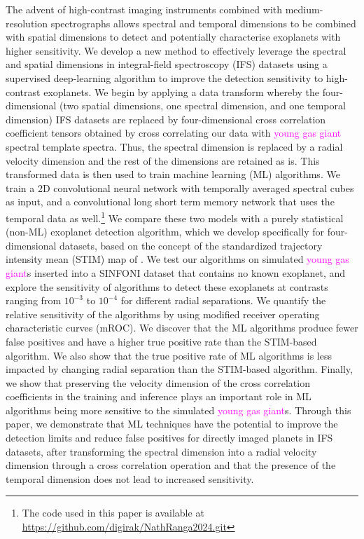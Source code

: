 \documentclass[referee]{aa} %
\newcommand{\newchange}[1]{\textcolor{magenta}{#1}}
\begin{document}
  \abstract
  {The advent of high-contrast imaging instruments combined with medium-resolution spectrographs allows spectral and temporal dimensions to be combined with spatial dimensions to detect and potentially characterise exoplanets with higher sensitivity.}
  {We develop a new method to effectively leverage the spectral and spatial dimensions in integral-field spectroscopy (IFS) datasets using a supervised deep-learning algorithm to improve the detection sensitivity to high-contrast exoplanets.}
  {We begin by applying a data transform whereby the four-dimensional (two spatial dimensions, one spectral dimension, and one temporal dimension) IFS datasets are replaced by four-dimensional cross correlation coefficient tensors obtained by cross correlating our data with \newchange{young gas giant} spectral template spectra.
  Thus, the spectral dimension is replaced by a radial velocity dimension and the rest of the dimensions are retained as is.
  This transformed data is then used to train machine learning (ML) algorithms.
  We train a 2D convolutional neural network 
  with temporally averaged spectral cubes as input, and a convolutional long short term memory network that uses the temporal data as well.\footnote{The code used in this paper is available at \url{https://github.com/digirak/NathRanga2024.git}}
  We compare these two models with a purely statistical (non-ML) exoplanet detection algorithm, which we develop specifically for four-dimensional datasets, based on the concept of the standardized trajectory intensity mean (STIM) map of \citet{2019Pairet}.
  We test our algorithms on simulated \newchange{young gas giant}s inserted into a SINFONI dataset that contains no known exoplanet, and explore the sensitivity of algorithms to detect these exoplanets at contrasts ranging from $10^{-3}$ to $10^{-4}$ for different radial separations.
  }
  {We quantify the relative sensitivity of the algorithms by using modified receiver operating characteristic curves (mROC).
  We discover that the ML algorithms produce fewer false positives and have a higher true positive rate than the STIM-based algorithm.
  We also show that the true positive rate of ML algorithms is less impacted by changing radial separation than the STIM-based algorithm.
  Finally, we show that preserving the velocity dimension of the cross correlation coefficients in the training and inference plays an important role in ML algorithms being more sensitive to the simulated \newchange{young gas giant}s.}
  {Through this paper, we demonstrate that ML techniques have the potential to improve the detection limits and reduce false positives for directly imaged planets in IFS datasets, after transforming the spectral dimension into a radial velocity dimension through a cross correlation operation and that the presence of the temporal dimension does not lead to increased sensitivity.
  }
   
\end{document}
